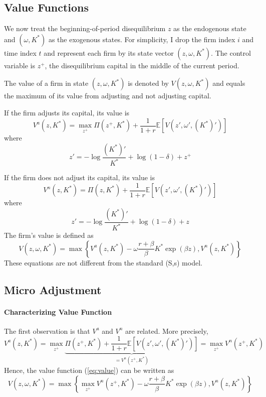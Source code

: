 \documentclass[12pt]{article}
\begin{document}
\subsection{Value Functions}
We now treat the beginning-of-period disequilibrium $z$ as the endogenous state and $(\omega, K^*)$ as the exogenous states. For simplicity, I drop the firm index $i$ and time index $t$ and represent each firm by its state vector $(z, \omega, K^*)$. The control variable is $z^+$, the disequilibrium capital in the middle of the current period.

The value of a firm in state $(z, \omega, K^*)$ is denoted by $V(z, \omega, K^*)$ and equals the maximum of its value from adjusting and not adjusting capital.

If the firm adjusts its capital, its value is
\begin{equation} \label{eq:Va}
	V^a(z, K^*) = \max_{z^+} \Pi(z^+, K^*) + \frac{1}{1+r} \mathbb{E}[V(z', \omega', (K^*)')]
\end{equation} 
where 
\begin{equation}
	z' = - \log \frac{(K^*)'}{K^*} + \log (1-\delta) + z^+
\end{equation}

If the firm does not adjust its capital, its value is
\begin{equation} \label{eq:Vn}
	V^n(z, K^*) = \Pi(z, K^*)  + \frac{1}{1+r} \mathbb{E}[V(z', \omega', (K^*)')]
\end{equation}
where 
\[z' = - \log \frac{(K^*)'}{K^*} + \log (1-\delta) + z \]
The firm's value is defined as
\begin{equation} \label{eq:value}
V(z, \omega, K^*) = \max\left\{V^a(z, K^*) - \omega \frac{r+\beta}{\beta} K^* \exp(\beta z), V^n(z, K^*)\right\}
\end{equation}
These equations are not different from the standard (S,s) model.

\subsection{Micro Adjustment}

\paragraph{Characterizing Value Function \\ [6pt]}

The first observation is that $V^a$ and $V^n$ are related. More precisely,
\begin{equation}
	V^a(z, K^*) = \max_{z^+} \underbrace{\Pi(z^+, K^*) + \frac{1}{1+r} \mathbb{E}[V(z', \omega', (K^*)')]}_{= V^n(z^+, K^*)} =  \max_{z^+} V^n(z^+, K^*)
\end{equation} 
Hence, the value function (\ref{eq:value}) can be written as
\begin{equation} \label{eq:modified_V}
	V(z, \omega, K^*) = \max\left\{\max_{z^+} V^n(z^+, K^*) - \omega \frac{r+\beta}{\beta} K^* \exp(\beta z), V^n(z, K^*)\right\}
\end{equation}
\end{document}
